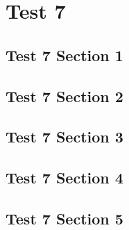 \chapter{Test 7}
\localtableofcontents
\clearpage

\section{Test 7 Section 1}

\linebreak

\section{Test 7 Section 2}

\linebreak

\section{Test 7 Section 3}

\linebreak

\section{Test 7 Section 4}

\linebreak

\section{Test 7 Section 5}

\linebreak